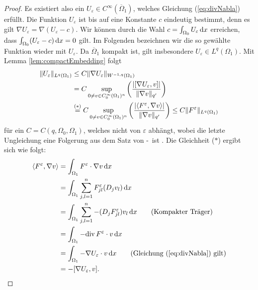 \begin{proof}
  Es existiert also ein $U_\varepsilon \in C^\infty(\overline\Omega_1)$, welches Gleichung (\ref{eq:divNabla}) erfüllt.
  Die Funktion $U_\varepsilon$ ist bis auf eine Konstante $c$ eindeutig bestimmt, denn es gilt $\nabla U_\varepsilon = \nabla( U_\varepsilon - c)$.
  Wir können durch die Wahl $c = \int_{\Omega_0} U_\varepsilon \, {\operatorname{d}\!{x}}$ erreichen, dass $\int_{\Omega_0} (U_\varepsilon - c) \, {\operatorname{d}\!{x}} = 0$  gilt.
  Im Folgenden bezeichnen wir die so gewählte Funktion wieder mit $U_\varepsilon$.
  Da $\overline\Omega_1$ kompakt ist, gilt insbesondere $U_\varepsilon \in L^q(\Omega_1)$.
  Mit Lemma \ref{lem:compactEmbedding} folgt
  \begingroup
  \addtolength{\jot}{1em}
  \begin{align}
    \lVert U_\varepsilon \rVert_{L^q(\Omega_1)}
    &\leq C \lVert  \nabla U_\varepsilon  \rVert_{W^{-1,q}(\Omega_1)} \nonumber\\
    &= C \sup_{0 \neq v \in C_0^\infty(\Omega_1)^n} \left(\frac{|[\nabla U_\varepsilon, v]|}{\lVert \nabla v \rVert_{q'}} \right) \nonumber\\
    &\overset{(\ast)}{=} C \sup_{0 \neq v \in C_0^\infty(\Omega_1)^n} \left( \frac{|\langle F^\varepsilon, \nabla v \rangle|}{\lVert \nabla v \rVert_{q'}}\right) 
    \leq C \lVert F^\varepsilon \rVert_{L^q(\Omega_1)} 
    \label{eq:inequalityUEpsilon}
  \end{align}
  \endgroup
  für ein $C = C(q,\Omega_0,\Omega_1)$, welches nicht von $\varepsilon$ abhängt, wobei die letzte Ungleichung eine Folgerung aus dem Satz von \hahn\hyp\banach\ ist \cite[S.98, Korollar III.1.7]{werner2011fa}.
  Die Gleichheit ($\ast$) ergibt sich wie folgt:
  \begin{align*}
    \langle F^\varepsilon, \nabla v \rangle
    &= \int_{\Omega_1} F^\varepsilon \cdot \nabla v \d x \\
    &= \int_{\Omega_1} \sum_{j,l=1}^n F_{jl}^\varepsilon (D_j v_l) \d x \\
    &= \int_{\Omega_1} \sum_{j,l=1}^n -(D_jF_{jl}^\varepsilon) v_l \d x \tag{Kompakter Träger}\\
    &= \int_{\Omega_1} -\div F^\varepsilon \cdot v \d x \\
    &= \int_{\Omega_1} -\nabla U_\varepsilon \cdot v \d x \tag{Gleichung (\ref{eq:divNabla}) gilt}\\
    &= -[\nabla U_\varepsilon, v].
  \end{align*}


\end{proof}

